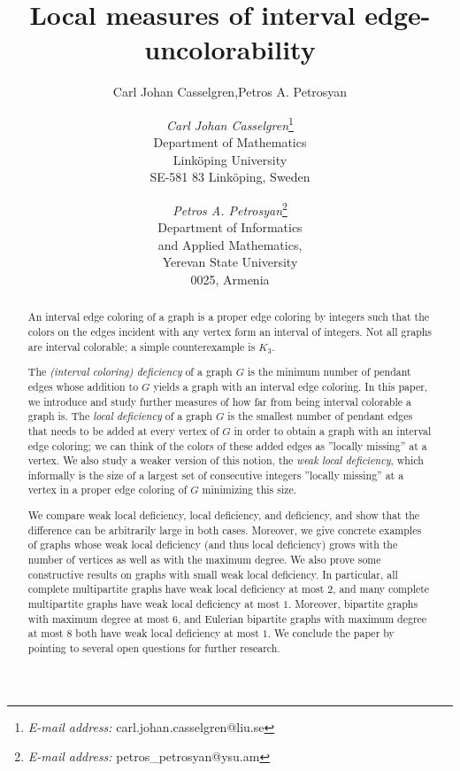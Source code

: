 \documentclass[12pt]{article}
\title{Local measures of interval edge-uncolorability}
\author{Carl Johan Casselgren,Petros A. Petrosyan}
\author{
{\sl Carl Johan Casselgren}\thanks{{\it E-mail address:} 
carl.johan.casselgren@liu.se}\\ 
Department of Mathematics \\
Link\"oping University \\ 
SE-581 83 Link\"oping, Sweden
%
%
\and
{\sl Petros A. Petrosyan}\thanks{{\it E-mail address:} 
petros\_petrosyan@ysu.am} \\
Department of Informatics \\ 
and Applied Mathematics,\\
Yerevan State University \\ 
0025, Armenia
}
\theoremstyle{plain}
\theoremstyle{definition}
\numberwithin{equation}{section}
\begin{document}
\maketitle

\begin{abstract}
An interval edge coloring of a graph is a proper edge coloring by integers
such that the colors on the edges incident with any vertex form an interval
of integers. Not all graphs are interval colorable; a simple counterexample is $K_3$.

The {\em (interval coloring) deficiency} of a graph $G$ is the minimum number of pendant 
edges whose addition to $G$ yields a graph with an interval edge coloring.
In this paper, we introduce and study further measures of how far from being interval
colorable a graph is. 
The {\em local deficiency} of a graph $G$ is the smallest
number of pendant edges that needs to be added at every vertex of $G$ in order to obtain
a graph with an interval edge coloring; we can think of the colors of these
added edges as ''locally missing'' at a vertex.
We also study a weaker version of this notion, the {\em weak local deficiency},
which informally is the size of a largest set of consecutive integers ''locally missing'' at
a vertex in a proper edge coloring of $G$ minimizing this size.


We compare weak local deficiency, local deficiency, and deficiency, and show
that the difference can be arbitrarily large in both cases.  Moreover, 
we give concrete examples of graphs whose weak local deficiency
(and thus local deficiency) grows
with the number of vertices as well as with the maximum degree.
%
We also prove some constructive results on graphs with small weak local deficiency.
In particular, all complete multipartite graphs have weak local deficiency
at most $2$, and many complete multipartite graphs have weak local deficiency at most $1$.
Moreover, bipartite graphs with maximum degree at most $6$, and Eulerian bipartite
graphs with maximum degree at most $8$ both have weak local deficiency at most $1$.
We conclude the paper by pointing to several open questions for further research.





\end{abstract}
\end{document}
